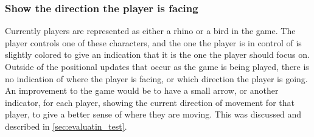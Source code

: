 \subsubsection{Show the direction the player is facing}
Currently players are represented as either a rhino or a bird in the game.
The player controls one of these characters, and the one the player is in control of is slightly colored to give an indication that it is the one the player should focus on.
Outside of the positional updates that occur as the game is being played, there is no indication of where the player is facing, or which direction the player is going.
An improvement to the game would be to have a small arrow, or another indicator, for each player, showing the current direction of movement for that player, to give a better sense of where they are moving.
This was discussed and described in \autoref{sec:evaluatin_test}.
